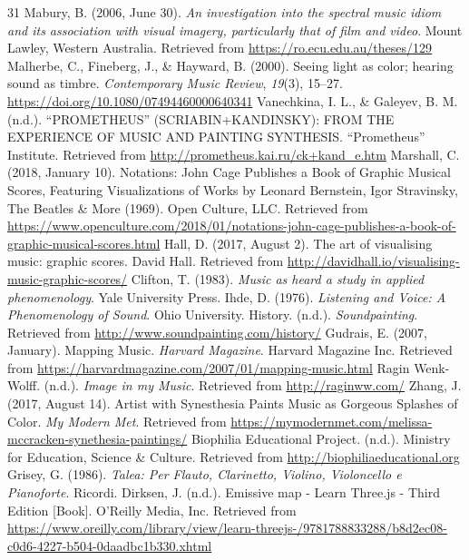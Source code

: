 \documentclass[sigconf]{nimeart}
\begin{document}
\begin{thebibliography}{31}
 {{ }}  Mabury, B. (2006, June 30). \emph{An investigation into the spectral music idiom and its association with visual imagery, particularly that of film and video}. Mount Lawley, Western Australia. Retrieved from \url{https://ro.ecu.edu.au/theses/129}{}  \hfill\break
{} {{ }}  Malherbe, C., Fineberg, J., \& Hayward, B. (2000). Seeing light as color; hearing sound as timbre. \emph{Contemporary Music Review}, \emph{19}(3), 15--27. \url{https://doi.org/10.1080/07494460000640341}{}
 {{ }}  Vanechkina, I. L., \& Galeyev, B. M. (n.d.). ``PROMETHEUS'' (SCRIABIN+KANDINSKY): FROM THE EXPERIENCE OF MUSIC AND PAINTING SYNTHESIS. ``Prometheus'' Institute. Retrieved from \url{http://prometheus.kai.ru/ck+kand_e.htm}{}
 {{ }}  Marshall, C. (2018, January 10). Notations: John Cage Publishes a Book of Graphic Musical Scores, Featuring Visualizations of Works by Leonard Bernstein, Igor Stravinsky, The Beatles \& More (1969). Open Culture, LLC. Retrieved from \url{https://www.openculture.com/2018/01/notations-john-cage-publishes-a-book-of-graphic-musical-scores.html}{}
 {{ }}  Hall, D. (2017, August 2). The art of visualising music: graphic scores. David Hall. Retrieved from \url{http://davidhall.io/visualising-music-graphic-scores/}{}
 {{ }}  Clifton, T. (1983). \emph{Music as heard a study in applied phenomenology}. Yale University Press.{}
 {{ }}  Ihde, D. (1976). \emph{Listening and Voice: A Phenomenology of Sound}. Ohio University.{}
 {{ }}  History. (n.d.). \emph{Soundpainting}. Retrieved from \url{http://www.soundpainting.com/history/}{}
 {{ }}  Gudrais, E. (2007, January). Mapping Music. \emph{Harvard Magazine}. Harvard Magazine Inc. Retrieved from \url{https://harvardmagazine.com/2007/01/mapping-music.html}{}
 {{ }}  Ragin Wenk-Wolff. (n.d.). \emph{Image in my Music}. Retrieved from \url{http://raginww.com/}{}
 {{ }}  Zhang, J. (2017, August 14). Artist with Synesthesia Paints Music as Gorgeous Splashes of Color. \emph{My Modern Met}. Retrieved from \url{https://mymodernmet.com/melissa-mccracken-synethesia-paintings/}{}
 {{ }}  Biophilia Educational Project. (n.d.). Ministry for Education, Science \& Culture. Retrieved from \url{http://biophiliaeducational.org}{}
 {{ }}  Grisey, G. (1986). \emph{Talea: Per Flauto, Clarinetto, Violino, Violoncello e Pianoforte}. Ricordi.{}
 {{ }}  Dirksen, J. (n.d.). Emissive map - Learn Three.js - Third Edition {[}Book{]}. O'Reilly Media, Inc. Retrieved from \url{https://www.oreilly.com/library/view/learn-threejs-/9781788833288/b8d2ec08-c0d6-4227-b504-0daadbc1b330.xhtml}{}

\end{thebibliography}
\end{document}
